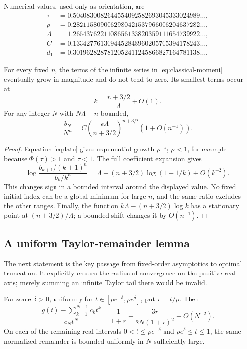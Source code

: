 Numerical values, used only as orientation, are
\begin{align*}
 \tau&=0.5040830082644554092582693045333024989\ldots,\\
 \rho&=0.2821158090062980421537966006204637282\ldots,\\
 \Lambda&=1.2654376221108656133820359111654739922\ldots,\\
 C&=0.1334277613094452848960205705394178243\ldots,\\
 d_1&=0.3019628287812052411245866827164781138\ldots.
\end{align*}

\begin{corollary}\label{cor:least}
For every fixed \(n\), the terms of the infinite series in
\eqref{eq:classical-moment} eventually grow in magnitude and do not tend
to zero. Its smallest terms occur at
\[
 k=\frac{n+3/2}{\Lambda}+O(1).
\]
For any integer \(N\) with \(N\Lambda-n\) bounded,
\begin{equation}\label{eq:least-size}
 \frac{b_N}{N^n}
 =C\left(\frac{e\Lambda}{n+3/2}\right)^{n+3/2}
       (1+O(n^{-1})).
\end{equation}
\end{corollary}

\begin{proof}
Equation \eqref{eq:late} gives exponential growth \(\rho^{-k}\);
\(\rho<1\), for example because \(\Phi(\tau)>1\) and \(\tau<1\).
The full coefficient expansion gives
\[
 \log\frac{b_{k+1}/(k+1)^n}{b_k/k^n}
 =\Lambda-(n+3/2)\log(1+1/k)+O(k^{-2}).
\]
This changes sign in a bounded interval around the displayed value.
No fixed initial index can be a global minimum for large \(n\),
and the same ratio excludes the other ranges.
Finally, the function \(k\Lambda-(n+3/2)\log k\) has a stationary
point at \((n+3/2)/\Lambda\); a bounded shift changes it by \(O(n^{-1})\).
\end{proof}

\subsection{A uniform Taylor-remainder lemma}

The next statement is the key passage from fixed-order asymptotics to
optimal truncation. It explicitly crosses the radius of convergence on
the positive real axis; merely summing an infinite Taylor tail there
would be invalid.

\begin{lemma}\label{lem:inverse-remainder}
For some \(\delta>0\), uniformly for
\(t\in[\rho e^{-\delta},\rho e^\delta]\), put \(r=t/\rho\). Then
\begin{equation}\label{eq:inverse-remainder}
 \frac{g(t)-\sum_{k=1}^{N-1}c_kt^k}{c_Nt^N}
 =\frac1{1+r}+\frac{3r}{2N(1+r)^2}+O(N^{-2}).
\end{equation}
On each of the remaining real intervals
\(0<t\leq\rho e^{-\delta}\) and
\(\rho e^\delta\leq t\leq1\), the same normalized remainder is
bounded uniformly in \(N\) sufficiently large.
\end{lemma}

